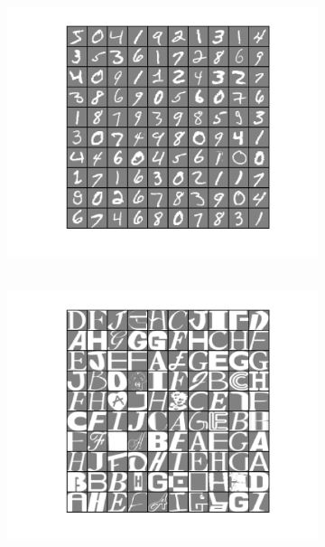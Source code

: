\documentclass[letterpaper,12pt]{article}
\begin{document}
\begin{figure}[hbt]
\centering
\begin{subfigure}{.3\textwidth}
  \centering
  \includegraphics[width=\linewidth]{mnist_example}
  \caption{~}
\end{subfigure}%
\begin{subfigure}{.3\textwidth}
  \centering
  \includegraphics[width=\linewidth]{notMnist_example}
  \caption{~}
\end{subfigure}
\begin{subfigure}{.3\textwidth}
  \centering

\end{subfigure}
\end{figure}
\end{document}
